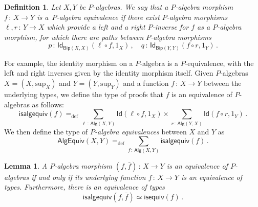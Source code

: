 \documentclass[10pt,a4paper,oneside,reqno]{amsart}
\theoremstyle{mythm}
\newtheorem{lemma}[theorem]{Lemma}
\theoremstyle{mydef}
\newtheorem{definition}[theorem]{Definition}
\theoremstyle{myrmk}
\newcommand{\ie}{\text{i.e.\ }}
\newcommand{\defeq}{=_{\mathrm{def}}}
\newcommand{\co}{\,{:}\,}
\newcommand{\Id}{\mathsf{Id}}
\newcommand{\Bip}{\mathsf{Bip}}
\newcommand{\Palg}{\mathsf{Alg}}
\renewcommand{\sup}{\mathrm{sup}}
\newcommand{\isalgequiv}{\mathsf{isalgequiv}}
\newcommand{\AlgEquiv}{\mathsf{AlgEquiv}}
\begin{document}
\begin{definition} Let $X, Y$ be $P$-algebras. We say that a $P$-algebra morphism $f \co X \to Y$ is 
 a~\emph{$P$-algebra equivalence}
if there exist $P$-algebra morphisms $\ell,r \co Y \to X$  which provide a left and a right $P$-inverse for $f$ as a
$P$-algebra morphism, \ie for
which there are paths between $P$-algebra morphisms
\[ 
p \co \Id_{\Bip(X,X)}( \ell \circ f,  1_X) \, , \quad q \co \Id_{\Bip(Y,Y)}( f \circ r , 1_Y) \, .
\]
\end{definition}

For example, the identity morphism on a $P$-algebra is a $P$-equivalence, with the left and right inverses given by the identity morphism itself. Given $P$-algebras $X = (X, \sup_X)$ and $Y = (Y, \sup_Y)$ and a function $f \co X \to Y$ between the underlying types, we define the type of proofs that $f$ is an equivalence of $P$-algebras as follows:
\[
\isalgequiv(f) \defeq   \sum_{\ell \co  \Palg(X,Y)} \Id( \ell \circ f, 1_X )  \times 
    \sum_{r  \co \Palg(Y, X)} \Id( f \circ r , 1_Y ) \, .
\]
We then define the type of \emph{$P$-algebra equivalences} between $X$ and $Y$ as
\[
\AlgEquiv(X, Y)
\defeq    \sum_{f \co \Palg(X,Y)} \isalgequiv(f)  \, . 
\] 


\begin{lemma}\label{WAlgSpace} A $P$-algebra morphism $(f, \bar{f}) \co X \to Y$ is an equivalence of
$P$-algebras if and only
if its underlying function $f \co X \to Y$ is an equivalence of types. Furthermore, there is an equivalence of types
\[
\isalgequiv(f, \bar{f})  \simeq \mathsf{isequiv}(f) \, . 
\]
\end{lemma}  
\end{document}
